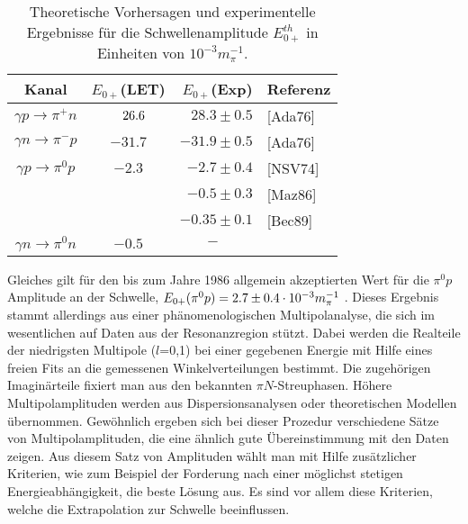 \begin{table}
\caption{Theoretische Vorhersagen und experimentelle Ergebnisse
f\"ur die Schwellenamplitude $ E_{0+}^{th}$ in Einheiten von
$10^{-3}m_\pi^{-1}$.}
\begin{center}
\begin{tabular}{|c||c|rl|} \hline
Kanal                  & $E_{0+}$(LET) & $E_{0+}$(Exp)  & Referenz \\ \hline
                                                                      \hline 
$\gamma p \to \pi^+ n$ &$\hspace{0.3cm} 26.6$    &  $28.3\pm 0.5$ & [Ada76] \\ \hline
$\gamma n \to \pi^- p$ &    $-31.7$    & $-31.9\pm 0.5$ & [Ada76] \\ \hline
$\gamma p \to \pi^0 p$ &    $-2.3$     &  $-2.7\pm 0.4$ & [NSV74] \\
                       &               &  $-0.5\pm 0.3$ & [Maz86] \\
		       &               & $-0.35\pm 0.1$ & [Bec89] \\ \hline  
$\gamma n \to \pi^0 n$ &    $-0.5$     & $-\hspace{1cm}$  &        \\ \hline
\end{tabular}
\end{center}
\end{table}

Gleiches gilt f\"ur den bis zum Jahre 1986 allgemein akzeptierten 
Wert f\"ur die $\pi^0 p$ Amplitude an der Schwelle, $E_{0+}(\pi^0 p)=
2.7\pm 0.4 \cdot 10^{-3} m_\pi^{-1}$ \cite{NSV74}. Dieses Ergebnis stammt allerdings aus
einer ph\"anomenologischen Multipolanalyse, die sich im wesentlichen
auf Daten aus der Resonanzregion st\"utzt. Dabei werden die Realteile
der niedrigsten Multipole ($l$=0,1) bei einer gegebenen  Energie mit
Hilfe eines freien Fits an die gemessenen Winkelverteilungen bestimmt. 
Die zugeh\"origen Imagin\"arteile fixiert man  aus
den bekannten $\pi N$-Streuphasen. H\"ohere Multipolamplituden werden
aus Dispersionsanalysen oder theoretischen Modellen \"ubernommen. 
Gew\"ohnlich ergeben sich bei
dieser Prozedur verschiedene S\"atze von Multipolamplituden, die eine
\"ahnlich gute \"Ubereinstimmung mit den Daten zeigen. Aus diesem Satz
von Amplituden w\"ahlt man mit Hilfe zus\"atzlicher Kriterien, wie
zum Beispiel der Forderung nach einer m\"oglichst stetigen 
Energieabh\"angigkeit, die beste L\"osung aus. Es sind vor allem diese
Kriterien, welche die Extrapolation zur Schwelle beeinflussen.

